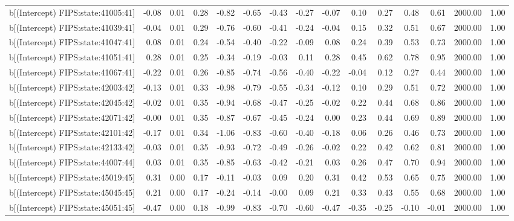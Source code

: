 \begin{table}[ht]
\begin{tabular}{rrrrrrrrrrrrrrr}
  b[(Intercept) FIPS:state:41005:41] & -0.08 & 0.01 & 0.28 & -0.82 & -0.65 & -0.43 & -0.27 & -0.07 & 0.10 & 0.27 & 0.48 & 0.61 & 2000.00 & 1.00 \\ 
  b[(Intercept) FIPS:state:41039:41] & -0.04 & 0.01 & 0.29 & -0.76 & -0.60 & -0.41 & -0.24 & -0.04 & 0.15 & 0.32 & 0.51 & 0.67 & 2000.00 & 1.00 \\ 
  b[(Intercept) FIPS:state:41047:41] & 0.08 & 0.01 & 0.24 & -0.54 & -0.40 & -0.22 & -0.09 & 0.08 & 0.24 & 0.39 & 0.53 & 0.73 & 2000.00 & 1.00 \\ 
  b[(Intercept) FIPS:state:41051:41] & 0.28 & 0.01 & 0.25 & -0.34 & -0.19 & -0.03 & 0.11 & 0.28 & 0.45 & 0.62 & 0.78 & 0.95 & 2000.00 & 1.00 \\ 
  b[(Intercept) FIPS:state:41067:41] & -0.22 & 0.01 & 0.26 & -0.85 & -0.74 & -0.56 & -0.40 & -0.22 & -0.04 & 0.12 & 0.27 & 0.44 & 2000.00 & 1.00 \\ 
  b[(Intercept) FIPS:state:42003:42] & -0.13 & 0.01 & 0.33 & -0.98 & -0.79 & -0.55 & -0.34 & -0.12 & 0.10 & 0.29 & 0.51 & 0.72 & 2000.00 & 1.00 \\ 
  b[(Intercept) FIPS:state:42045:42] & -0.02 & 0.01 & 0.35 & -0.94 & -0.68 & -0.47 & -0.25 & -0.02 & 0.22 & 0.44 & 0.68 & 0.86 & 2000.00 & 1.00 \\ 
  b[(Intercept) FIPS:state:42071:42] & -0.00 & 0.01 & 0.35 & -0.87 & -0.67 & -0.45 & -0.24 & 0.00 & 0.23 & 0.44 & 0.69 & 0.89 & 2000.00 & 1.00 \\ 
  b[(Intercept) FIPS:state:42101:42] & -0.17 & 0.01 & 0.34 & -1.06 & -0.83 & -0.60 & -0.40 & -0.18 & 0.06 & 0.26 & 0.46 & 0.73 & 2000.00 & 1.00 \\ 
  b[(Intercept) FIPS:state:42133:42] & -0.03 & 0.01 & 0.35 & -0.93 & -0.72 & -0.49 & -0.26 & -0.02 & 0.22 & 0.42 & 0.62 & 0.81 & 2000.00 & 1.00 \\ 
  b[(Intercept) FIPS:state:44007:44] & 0.03 & 0.01 & 0.35 & -0.85 & -0.63 & -0.42 & -0.21 & 0.03 & 0.26 & 0.47 & 0.70 & 0.94 & 2000.00 & 1.00 \\ 
  b[(Intercept) FIPS:state:45019:45] & 0.31 & 0.00 & 0.17 & -0.11 & -0.03 & 0.09 & 0.20 & 0.31 & 0.42 & 0.53 & 0.65 & 0.75 & 2000.00 & 1.00 \\ 
  b[(Intercept) FIPS:state:45045:45] & 0.21 & 0.00 & 0.17 & -0.24 & -0.14 & -0.00 & 0.09 & 0.21 & 0.33 & 0.43 & 0.55 & 0.68 & 2000.00 & 1.00 \\ 
  b[(Intercept) FIPS:state:45051:45] & -0.47 & 0.00 & 0.18 & -0.99 & -0.83 & -0.70 & -0.60 & -0.47 & -0.35 & -0.25 & -0.10 & -0.01 & 2000.00 & 1.00 \\ 

\end{tabular}
\end{table}

